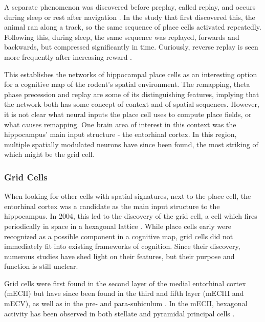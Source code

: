 \documentclass{article}
\begin{document}
    A separate phenomenon was discovered before preplay, called replay, and occurs during sleep or rest after navigation \parencite{Wilson1994,Olafsdottir2016}. In the study that first discovered this, the animal ran along a track, so the same sequence of place cells activated repeatedly. Following this, during sleep, the same sequence was replayed, forwards and backwards, but compressed significantly in time. Curiously, reverse replay is seen more frequently after increasing reward \parencite{Ambrosa2013}.

    This establishes the networks of hippocampal place cells as an interesting option for a cognitive map of the rodent's spatial environment. The remapping, theta phase precession and replay are some of its distinguishing features, implying that the network both has some concept of context and of spatial sequences. However, it is not clear what neural inputs the place cell uses to compute place fields, or what causes remapping. One brain area of interest in this context was the hippocampus' main input structure - the entorhinal cortex. In this region, multiple spatially modulated neurons have since been found, the most striking of which might be the grid cell.

    \subsubsection{Grid Cells} \label{grid cells}
    When looking for other cells with spatial signatures, next to the place cell, the entorhinal cortex was a candidate as the main input structure to the hippocampus. In 2004, this led to the discovery of the grid cell, a cell which fires periodically in space in a hexagonal lattice \parencite{Hafting2005}. While place cells early were recognized as a possible component in a cognitive map, grid cells did not immediately fit into existing frameworks of cognition. Since their discovery, numerous studies have shed light on their features, but their purpose and function is still unclear. 

    Grid cells were first found in the second layer of the medial entorhinal cortex (mECII) but have since been found in the third and fifth layer (mECIII and mECV), as well as in the pre- and para-subiculum \parencite{Boccara2010}. In the mECII, hexagonal activity has been observed in both stellate and pyramidal principal cells \parencite{Rowland2018}.
    
\end{document}

